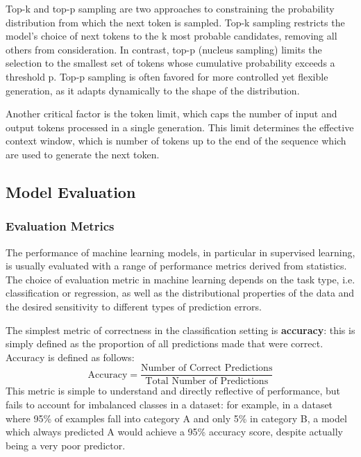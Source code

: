 \documentclass{report}
\begin{document}
\begin{itemize}
Top-k and top-p sampling are two approaches to constraining the probability distribution from which the next token is sampled. Top-k sampling restricts the model's choice of next tokens to the k most probable candidates, removing all others from consideration\cite{fan2018hierarchical}. In contrast, top-p (nucleus sampling) limits the selection to the smallest set of tokens whose cumulative probability exceeds a threshold p\cite{holtzman2019curious}. Top-p sampling is often favored for more controlled yet flexible generation, as it adapts dynamically to the shape of the distribution.

Another critical factor is the token limit, which caps the number of input and output tokens processed in a single generation\cite{radford2019language}. This limit determines the effective context window, which is number of tokens up to the end of the sequence which are used to generate the next token.
\end{itemize}

\subsection{Model Evaluation} \label{sec:lr-model-evaluation-selection}

\subsubsection{Evaluation Metrics}

The performance of machine learning models, in particular in supervised learning, is usually evaluated with a range of performance metrics derived from statistics. The choice of evaluation metric in machine learning depends on the task type, i.e. classification or regression, as well as the distributional properties of the data and the desired sensitivity to different types of prediction errors.

The simplest metric of correctness in the classification setting is \textbf{accuracy}: this is simply defined as the proportion of all predictions made that were correct\cite{shaun2025principles}. Accuracy is defined as follows:
\begin{equation}
\text{Accuracy} = \frac{\text{Number of Correct Predictions}}{\text{Total Number of Predictions}}
\end{equation}
This metric is simple to understand and directly reflective of performance, but fails to account for imbalanced classes in a dataset: for example, in a dataset where 95\% of examples fall into category A and only 5\% in category B, a model which always predicted A would achieve a 95\% accuracy score, despite actually being a very poor predictor.
\end{document}
